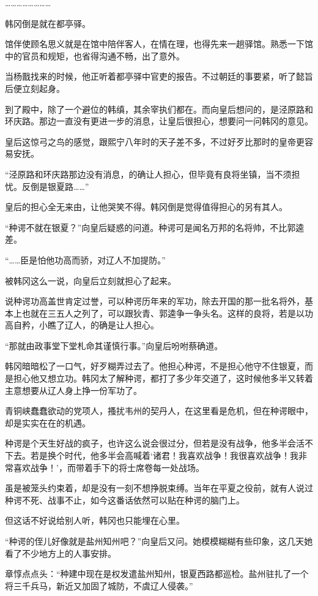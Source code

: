 ……………………

韩冈倒是就在都亭驿。

馆伴使顾名思义就是在馆中陪伴客人，在情在理，也得先来一趟驿馆。熟悉一下馆中的官员和规矩，也省得沟通不畅，出了意外。

当杨戬找来的时候，他正听着都亭驿中官吏的报告。不过朝廷的事要紧，听了懿旨后便立刻起身。

到了殿中，除了一个避位的韩缜，其余宰执们都在。而向皇后想问的，是泾原路和环庆路。那边一直没有更进一步的消息，让皇后很担心，想要问一问韩冈的意见。

皇后这惊弓之鸟的感觉，跟熙宁八年时的天子差不多，不过好歹比那时的皇帝更容易安抚。

“泾原路和环庆路那边没有消息，的确让人担心，但毕竟有良将坐镇，当不须担忧。反倒是银夏路……”

皇后的担心全无来由，让他哭笑不得。韩冈倒是觉得值得担心的另有其人。

“种谔不就在银夏？”向皇后疑惑的问道。种谔可是闻名万邦的名将帅，不比郭逵差。

“……臣是怕他功高而骄，对辽人不加提防。”

被韩冈这么一说，向皇后立刻就担心了起来。

说种谔功高盖世肯定过誉，可以种谔历年来的军功，除去开国的那一批名将外，基本上也就在三五人之列了，可以跟狄青、郭逵争一争头名。这样的良将，若是以功高自矜，小瞧了辽人，的确是让人担心。

“那就由政事堂下堂札命其谨慎行事。”向皇后吩咐蔡确道。

韩冈暗暗松了一口气，好歹糊弄过去了。他担心种谔，不是担心他守不住银夏，而是担心他又想立功。韩冈太了解种谔，都打了多少年交道了，这时候他多半又转着主意想要从辽人身上挣一份军功了。

青铜峡蠢蠢欲动的党项人，搔扰韦州的契丹人，在这里看是危机，但在种谔眼中，却是实实在在的机遇。

种谔是个天生好战的疯子，也许这么说会很过分，但若是没有战争，他多半会活不下去。若是换个时代，他多半会高喊着‘诸君！我喜欢战争！我很喜欢战争！我非常喜欢战争！’，而带着手下的将士席卷每一处战场。

虽是被笼头约束着，却是没有一刻不想挣脱束缚。当年在平夏之役前，就有人说过种谔不死、战事不止，如今这番话依然可以贴在种谔的脑门上。

但这话不好说给别人听，韩冈也只能埋在心里。

“种谔的侄儿好像就是盐州知州吧？”向皇后又问。她模模糊糊有些印象，这几天她看了不少地方上的人事安排。

章惇点点头：“种建中现在是权发遣盐州知州，银夏西路都巡检。盐州驻扎了一个将三千兵马，新近又加固了城防，不虞辽人侵袭。”

